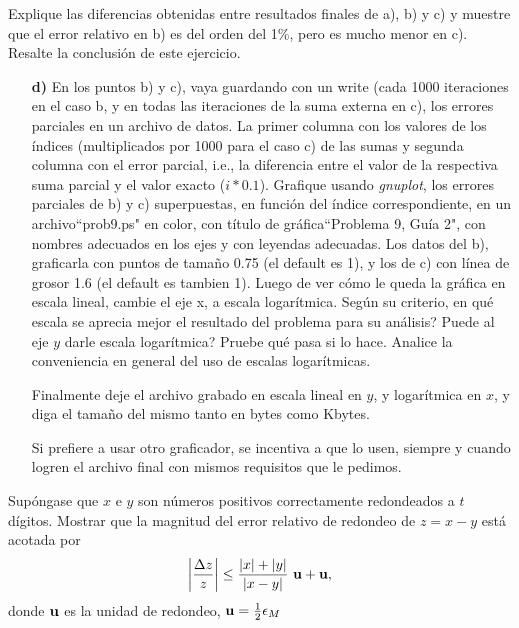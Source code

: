 \documentclass[a4paper]{article}
\newcounter{problema}
\newcommand{\prob}[1]{\vspace{0.33cm}\stepcounter{problema}
                 \noindent{\bf Problema \arabic{problema}:}{\it #1}}
\begin{document}
{ Explique las diferencias obtenidas entre resultados finales de a), b) y c) y muestre que el error relativo en b) es del orden
	del 1\%, pero es mucho menor en c). Resalte la conclusi\'on de este ejercicio. }


\begin{enumerate}
\item[{\bf d)}] En los puntos b) y c), vaya guardando con un write (cada 1000 iteraciones en el caso b, 
y en todas las iteraciones de la suma externa en c), los errores parciales en un archivo de datos.  
La primer columna con los valores de los \'indices (multiplicados por 1000 para el caso c) de las sumas 
y segunda columna con el error parcial, i.e., la diferencia entre el valor de la respectiva suma parcial y el valor exacto ($i*0.1$).  
Grafique usando {\em gnuplot}, los errores parciales de b) y c) superpuestas, en funci\'on del 
\'indice correspondiente, en un archivo``prob9.ps" en color, con t\'itulo de gr\'afica``Problema 9, 
Gu\'ia 2", con nombres adecuados en los ejes y con leyendas adecuadas. 
Los datos del b), graficarla con puntos de tama\~no 0.75 (el default es 1), y los de c) con l\'inea
de grosor 1.6 (el default es tambien 1). 
Luego de ver c\'omo le queda la gr\'afica en escala lineal, cambie el eje x, 
a escala logar\'itmica. Seg\'un su criterio, en qu\'e escala se 
aprecia mejor el resultado del problema para su an\'alisis? Puede al eje $y$ darle escala 
logar\'itmica? Pruebe qu\'e pasa si lo hace.
Analice la conveniencia en general del uso de escalas logar\'itmicas.

Finalmente deje el archivo grabado en escala lineal en $y$, y logar\'itmica en $x$, y diga el 
tama\~no del mismo tanto en bytes como Kbytes. 

Si prefiere a usar otro graficador, se incentiva a que lo usen, siempre y cuando logren el 
archivo final con mismos requisitos que le pedimos.


\end{enumerate}
 

% 
\prob{} Sup\'ongase que $x$ e $y$ son n\'umeros positivos correctamente redondeados
a $t$ d\'igitos. Mostrar que la magnitud del error relativo de redondeo de
$z=x-y$ est\'a acotada por
$$
\left| \frac{\Delta z}{z} \right| \leq \frac{|x| + |y|}{|x-y|}\ {\bf u} + {\bf u},
$$
\noindent
donde ${\bf u}$ es la unidad de redondeo,  ${\bf u}=\frac12 \epsilon_M$
\end{document}
